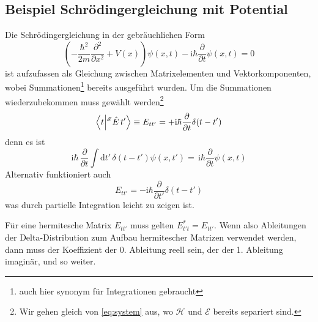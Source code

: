 \documentclass[12pt]{article}
\begin{document}
\subsection{Beispiel Schrödingergleichung mit Potential}
Die Schrödingergleichung in der gebräuchlichen Form 
\begin{equation*}
\left(-\frac {\hbar^2}{2m}\frac{\partial^2}{\partial x^2} +V(x)\right)\psi(x,t)
-\mathrm {i} \hbar \frac {\partial }{\partial t}\psi(x,t) = 0
\end{equation*} 
ist aufzufassen als Gleichung zwischen Matrixelementen und Vektorkomponenten, wobei Summationen\footnote{auch hier synonym für Integrationen gebraucht} bereits ausgeführt wurden. Um die Summationen wiederzubekommen muss gewählt werden\footnote{Wir gehen gleich von \eqref{eq:system} aus, wo $\mathscr{H}$ und $\mathscr{E}$ bereits separiert sind.}
\begin{equation*}
\bra{t}\ket{^\mathscr{E}\hat{E}\,t'}\equiv E_{tt'} = 
+\mathrm {i} \hbar \frac{\partial }{\partial t}\delta(t-t')
\end{equation*} 
denn es ist 
\begin{equation*}
\mathrm{i}\hbar\,\frac{\partial }{\partial t} \int \mathrm{d}t'\,\delta(t-t') \psi (x ,t')
=\, \mathrm {i} \hbar \frac {\partial }{\partial t}\psi (x ,t)
\end{equation*}
Alternativ funktioniert auch
\begin{equation*}
E_{tt'} = - \mathrm {i} \hbar \frac{\partial }{\partial t'}\delta(t-t')
\end{equation*} 
was durch partielle Integration leicht zu zeigen ist.

Für eine hermitesche Matrix $E_{tt'}$ muss gelten $E_{t't}^* = E_{tt'}$. Wenn also Ableitungen der Delta-Distribution zum Aufbau hermitescher Matrizen verwendet werden, dann muss der Koeffizient der 0. Ableitung reell sein, der der 1. Ableitung imaginär, und so weiter.
\end{document}
